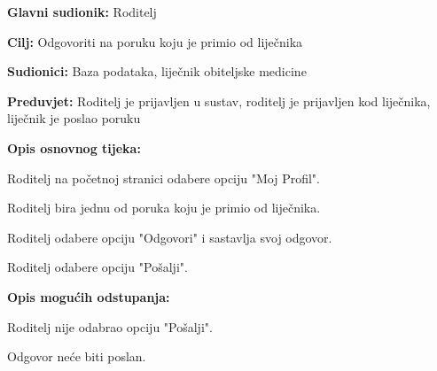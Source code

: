					\noindent {}
					\begin{packed_item}
						
						\item \textbf{Glavni sudionik: }Roditelj
						\item  \textbf{Cilj:} Odgovoriti na poruku koju je primio od liječnika
						\item  \textbf{Sudionici:} Baza podataka, liječnik obiteljske medicine
						\item  \textbf{Preduvjet:} Roditelj je prijavljen u sustav, roditelj je prijavljen kod liječnika, liječnik je poslao poruku
						\item  \textbf{Opis osnovnog tijeka:}
						
						\item[] \begin{packed_enum}
							
							\item Roditelj na početnoj stranici odabere opciju "Moj Profil".
							\item Roditelj bira jednu od poruka koju je primio od liječnika.
							\item Roditelj odabere opciju "Odgovori" i sastavlja svoj odgovor.
							\item Roditelj odabere opciju "Pošalji".
						\end{packed_enum}
						
						\item  \textbf{Opis mogućih odstupanja:}
						
						\item[] \begin{packed_item}
							
							\item[4.a] Roditelj nije odabrao opciju "Pošalji".
							\item[] \begin{packed_enum}
								
								\item Odgovor neće biti poslan.
							\end{packed_enum}
							
							
						\end{packed_item}
						
						
					\end{packed_item}
					
